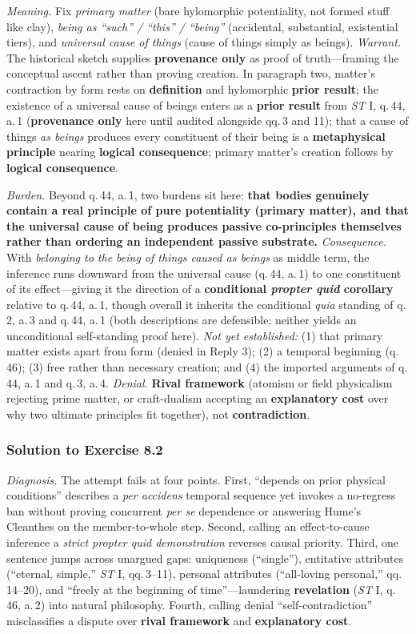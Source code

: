 \emph{Meaning.} Fix \emph{primary matter} (bare hylomorphic potentiality, not formed stuff like clay), \emph{being as ``such'' / ``this'' / ``being''} (accidental, substantial, existential tiers), and \emph{universal cause of things} (cause of things simply as beings). \emph{Warrant.} The historical sketch supplies \textbf{provenance only} as proof of truth---framing the conceptual ascent rather than proving creation. In paragraph two, matter's contraction by form rests on \textbf{definition} and hylomorphic \textbf{prior result}; the existence of a universal cause of beings enters as a \textbf{prior result} from \emph{ST} I, q.\,44, a.\,1 (\textbf{provenance only} here until audited alongside qq.\,3 and 11); that a cause of things \emph{as beings} produces every constituent of their being is a \textbf{metaphysical principle} nearing \textbf{logical consequence}; primary matter's creation follows by \textbf{logical consequence}.

\emph{Burden.} Beyond q.\,44, a.\,1, two burdens sit here: \textbf{that bodies genuinely contain a real principle of pure potentiality (primary matter), and that the universal cause of being produces passive co-principles themselves rather than ordering an independent passive substrate.} \emph{Consequence.} With \emph{belonging to the being of things caused as beings} as middle term, the inference runs downward from the universal cause (q.\,44, a.\,1) to one constituent of its effect---giving it the direction of a \textbf{conditional \emph{propter quid} corollary} relative to q.\,44, a.\,1, though overall it inherits the conditional \emph{quia} standing of q.\,2, a.\,3 and q.\,44, a.\,1 (both descriptions are defensible; neither yields an unconditional self-standing proof here). \emph{Not yet established:} (1) that primary matter exists apart from form (denied in Reply 3); (2) a temporal beginning (q.\,46); (3) free rather than necessary creation; and (4) the imported arguments of q.\,44, a.\,1 and q.\,3, a.\,4. \emph{Denial.} \textbf{Rival framework} (atomism or field physicalism rejecting prime matter, or craft-dualism accepting an \textbf{explanatory cost} over why two ultimate principles fit together), not \textbf{contradiction}.

\subsubsection*{Solution to Exercise 8.2}
\emph{Diagnosis.} The attempt fails at four points. First, ``depends on prior physical conditions'' describes a \emph{per accidens} temporal sequence yet invokes a no-regress ban without proving concurrent \emph{per se} dependence or answering Hume's Cleanthes on the member-to-whole step. Second, calling an effect-to-cause inference a \emph{strict propter quid demonstration} reverses causal priority. Third, one sentence jumps across unargued gaps: uniqueness (``single''), entitative attributes (``eternal, simple,'' \emph{ST} I, qq.\,3--11), personal attributes (``all-loving personal,'' qq.\,14--20), and ``freely at the beginning of time''---laundering \textbf{revelation} (\emph{ST} I, q.\,46, a.\,2) into natural philosophy. Fourth, calling denial ``self-contradiction'' misclassifies a dispute over \textbf{rival framework} and \textbf{explanatory cost}.

